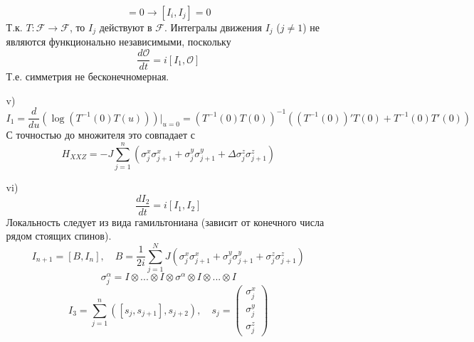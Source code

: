 \documentclass[12pt]{article}
\theoremstyle{definition}
\begin{document}
\begin{enumerate}
\begin{itemize}
\begin{equation}
        \end{equation}
        \begin{equation}
            [H_i,H_j]=0\rightarrow\boxed{[I_i,I_j]=0}
        \end{equation}
        Т.к. $T:\mathcal{F}\rightarrow\mathcal{F}$, то $I_j$ действуют в $\mathcal{F}$. Интегралы движения $I_j$ ($j\neq1$) не являются функционально независимыми, поскольку
        \begin{equation}
            \frac{d\mathcal{O}}{dt}=i[I_1,\mathcal{O}]
        \end{equation}
        Т.е. симметрия не бесконечномерная.
        \item[v)] 
        \begin{equation}
            I_1=\frac{d}{du}(\log(T^{-1}(0)T(u)))|_{u=0}=(T^{-1}(0)T(0))^{-1}((T^{-1}(0))'T(0)+T^{-1}(0)T'(0))
        \end{equation}
        С точностью до множителя это совпадает с
        \begin{equation}
            H_{XXZ}=-J\sum\limits_{j=1}^n(\sigma_j^x\sigma^x_{j+1}+\sigma_j^y\sigma^y_{j+1}+\Delta \sigma_j^z\sigma^z_{j+1})
        \end{equation}
        \item[vi)]
        \begin{equation}
            \frac{dI_2}{dt}=i[I_1,I_2]
        \end{equation}
        Локальность следует из вида гамильтониана (зависит от конечного числа рядом стоящих спинов).
        \begin{equation}
            I_{n+1}=[B,I_n],\quad B=\frac{1}{2i}\sum\limits_{j=1}^NJ(\sigma^x_j\sigma^x_{j+1}+\sigma^y_j\sigma^y_{j+1}+\sigma^z_j\sigma^z_{j+1})
        \end{equation}
        \begin{equation}
            \sigma^\alpha_j=I\otimes...\otimes I\otimes\sigma^\alpha\otimes I\otimes...\otimes I
        \end{equation}
        \begin{equation}
            I_3=\sum\limits_{j=1}^n([s_j,s_{j+1}],s_{j+2}),\quad s_j=\begin{pmatrix}
                \sigma^x_j\\
                \sigma^y_j\\
                \sigma^z_j
            \end{pmatrix}
        \end{equation}
        \begin{equation}

\end{equation}
\end{itemize}
\end{enumerate}
\end{document}
